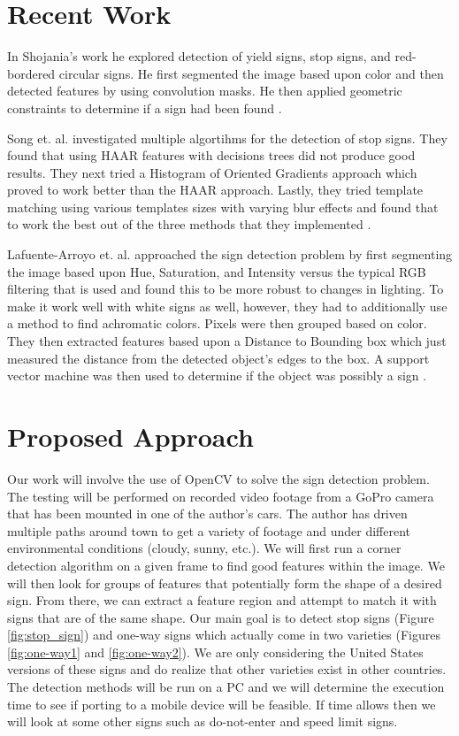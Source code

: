 \documentclass[10pt,twocolumn,letterpaper]{article}
\begin{document}
\section{Recent Work}

In Shojania's work he explored detection of yield signs, stop signs, and red-bordered circular signs. He first segmented the image based upon color and then detected features by using convolution masks. He then applied geometric constraints to determine if a sign had been found \cite{Shojania2007}. 

Song et. al. investigated multiple algortihms for the detection of stop signs. They found that using HAAR features with decisions trees did not produce good results. They next tried a Histogram of Oriented Gradients approach which proved to work better than the HAAR approach. Lastly, they tried template matching using various templates sizes with varying blur effects and found that to work the best out of the three methods that they implemented \cite{Song2008}.

Lafuente-Arroyo et. al. approached the sign detection problem by first segmenting the image based upon Hue, Saturation, and Intensity versus the typical RGB filtering that is used and found this to be more robust to changes in lighting. To make it work well with white signs as well, however, they had to additionally use a method to find achromatic colors. Pixels were then grouped based on color. They then extracted features based upon a Distance to Bounding box which just measured the distance from the detected object's edges to the box. A support vector machine was then used to determine if the object was possibly a sign \cite{Lafuente-Arroyo2010}. 


\section{Proposed Approach}
Our work will involve the use of OpenCV to solve the sign detection problem. The testing will be performed on recorded video footage from a GoPro camera that has been mounted in one of the author's cars. The author has driven multiple paths around town to get a variety of footage and under different environmental conditions (cloudy, sunny, etc.). We will first run a corner detection algorithm on a given frame to find good features within the image. We will then look for groups of features that potentially form the shape of a desired sign. From there, we can extract a feature region and attempt to match it with signs that are of the same shape. Our main goal is to detect stop signs (Figure \ref{fig:stop_sign}) and one-way signs which actually come in two varieties (Figures \ref{fig:one-way1} and \ref{fig:one-way2}). We are only considering the United States versions of these signs and do realize that other varieties exist in other countries. The detection methods will be run on a PC and we will determine the execution time to see if porting to a mobile device will be feasible. If time allows then we will look at some other signs such as do-not-enter and speed limit signs.
\end{document}
